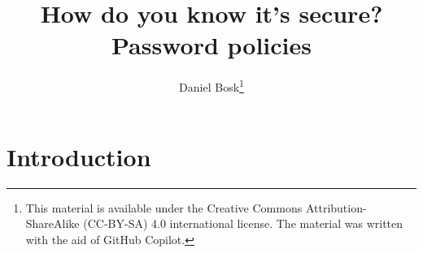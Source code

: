 \title{%
  How do you know it's secure?\\
  Password policies
}
\author{Daniel Bosk\thanks{%
    This material is available under the Creative Commons 
    Attribution-ShareAlike (CC-BY-SA) 4.0 international license.
    The material was written with the aid of GitHub Copilot.
}}

\begin{frame}
  \maketitle
\end{frame}

\mode*

\begin{abstract}
  
\end{abstract}

\clearpage

\section{Introduction}












